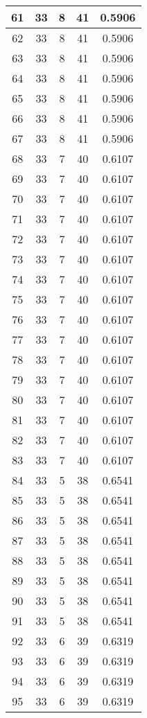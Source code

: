 \documentclass[letterpaper, 12pt]{article}
\begin{document}
\begin{longtable}{|c|c|c|c|c|}
61 & 33 & 8 & 41 & 0.5906 \\
\hline
62 & 33 & 8 & 41 & 0.5906 \\
\hline
63 & 33 & 8 & 41 & 0.5906 \\
\hline
64 & 33 & 8 & 41 & 0.5906 \\
\hline
65 & 33 & 8 & 41 & 0.5906 \\
\hline
66 & 33 & 8 & 41 & 0.5906 \\
\hline
67 & 33 & 8 & 41 & 0.5906 \\
\hline
68 & 33 & 7 & 40 & 0.6107 \\
\hline
69 & 33 & 7 & 40 & 0.6107 \\
\hline
70 & 33 & 7 & 40 & 0.6107 \\
\hline
71 & 33 & 7 & 40 & 0.6107 \\
\hline
72 & 33 & 7 & 40 & 0.6107 \\
\hline
73 & 33 & 7 & 40 & 0.6107 \\
\hline
74 & 33 & 7 & 40 & 0.6107 \\
\hline
75 & 33 & 7 & 40 & 0.6107 \\
\hline
76 & 33 & 7 & 40 & 0.6107 \\
\hline
77 & 33 & 7 & 40 & 0.6107 \\
\hline
78 & 33 & 7 & 40 & 0.6107 \\
\hline
79 & 33 & 7 & 40 & 0.6107 \\
\hline
80 & 33 & 7 & 40 & 0.6107 \\
\hline
81 & 33 & 7 & 40 & 0.6107 \\
\hline
82 & 33 & 7 & 40 & 0.6107 \\
\hline
83 & 33 & 7 & 40 & 0.6107 \\
\hline
84 & 33 & 5 & 38 & 0.6541 \\
\hline
85 & 33 & 5 & 38 & 0.6541 \\
\hline
86 & 33 & 5 & 38 & 0.6541 \\
\hline
87 & 33 & 5 & 38 & 0.6541 \\
\hline
88 & 33 & 5 & 38 & 0.6541 \\
\hline
89 & 33 & 5 & 38 & 0.6541 \\
\hline
90 & 33 & 5 & 38 & 0.6541 \\
\hline
91 & 33 & 5 & 38 & 0.6541 \\
\hline
92 & 33 & 6 & 39 & 0.6319 \\
\hline
93 & 33 & 6 & 39 & 0.6319 \\
\hline
94 & 33 & 6 & 39 & 0.6319 \\
\hline
95 & 33 & 6 & 39 & 0.6319 \\

\end{longtable}
\end{document}
